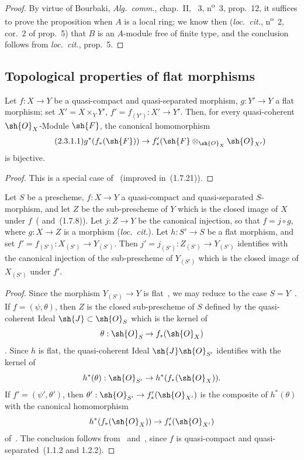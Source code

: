 \begin{proof}
By virtue of Bourbaki, \emph{Alg.~comm.}, chap.~II, \textsection~3, n\textsuperscript{o}~3, prop.~12, it suffices to prove the proposition when $A$ is a local ring; we know then (\emph{loc.~cit.}, n\textsuperscript{o}~2, cor.~2 of prop.~5) that $B$ is an $A$-module free of finite type, and the conclusion follows from \emph{loc.~cit.}, prop.~5.
\end{proof}

\subsection{Topological properties of flat morphisms}
\label{subsection:IV.2.3}

\begin{lemma}[2.3.1]
\label{IV.2.3.1}
Let $f:X\to Y$ be a quasi-compact and quasi-separated morphism, $g:Y'\to Y$ a flat morphism; set $X'=X\times_Y Y'$, $f'=f_{(Y')}:X'\to Y'$.
Then, for every quasi-coherent $\sh{O}_X$-Module $\sh{F}$, the canonical homomorphism
\begin{equation}
\tag{2.3.1.1}
\label{IV.2.3.1.1}
  g^*(f_*(\sh{F})) \to f'_*(\sh{F}\otimes_{\sh{O}_X}\sh{O}_{X'})
\end{equation}
is bijective.
\end{lemma}

\begin{proof}
This is a special case of~ (improved in~(1.7.21)).
\end{proof}

\begin{proposition}[2.3.2]
\label{IV.2.3.2}
Let $S$ be a prescheme, $f:X\to Y$ a quasi-compact and quasi-separated $S$-morphism, and let $Z$ be the sub-prescheme of $Y$ which is the closed image of $X$ under $f$~\textnormal{(} and~(1.7.8)\textnormal{)}.
Let $j:Z\to Y$ be the canonical injection, so that $f=j\circ g$, where $g:X\to Z$ is a morphism \textnormal{(}\emph{loc.~cit.}\textnormal{)}.
Let $h:S'\to S$ be a flat morphism, and set $f'=f_{(S')}:X_{(S')}\to Y_{(S')}$.
Then $j'=j_{(S')}:Z_{(S')}\to Y_{(S')}$ identifies with the canonical injection of the sub-prescheme of $Y_{(S')}$ which is the closed image of $X_{(S')}$ under $f'$.
\end{proposition}

\begin{proof}
Since the morphism $Y_{(S')}\to Y$ is flat~, we may reduce to the case $S=Y$~.
If $f=(\psi,\theta)$, then $Z$ is the closed sub-prescheme of $S$ defined by the quasi-coherent Ideal $\sh{J}\subset\sh{O}_S$ which is the kernel of
\[
  \theta:\sh{O}_S\to f_*(\sh{O}_X)
\]
.
Since $h$ is flat, the quasi-coherent Ideal $\sh{J}\sh{O}_{S'}$ identifies with the kernel of
\[
  h^*(\theta):\sh{O}_{S'}\to h^*(f_*(\sh{O}_X)).
\]
If $f'=(\psi',\theta')$, then $\theta':\sh{O}_{S'}\to f'_*(\sh{O}_{X'})$ is the composite of $h^*(\theta)$ with the canonical homomorphism
\[
  h^*(f_*(\sh{O}_X))\to f'_*(\sh{O}_{X'})
\]
of~.
The conclusion follows from~ and~, since $f$ is quasi-compact and quasi-separated~(1.1.2 and 1.2.2).
\end{proof}

